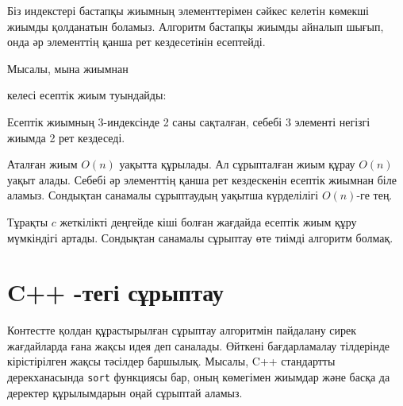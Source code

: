 Біз индекстері бастапқы жиымның элементтерімен сәйкес келетін көмекші жиымды қолданатын боламыз. Алгоритм бастапқы  жиымды айналып шығып, онда әр элементтің қанша рет кездесетінін есептейді.

Мысалы, мына жиымнан
\begin{center}
\end{center}
келесі есептік жиым туындайды:
\begin{center}
\end{center}

Есептік жиымның 3-индексінде
2 саны сақталған, себебі
3 элементі негізгі жиымда 2 рет кездеседі.

Аталған жиым $O(n)$ уақытта құрылады. Ал сұрыпталған
жиым құрау $O(n)$ уақыт алады. Себебі әр элементтің 
қанша рет кездескенін есептік жиымнан біле аламыз.
Сондықтан санамалы сұрыптаудың уақытша күрделілігі $O(n)$-ге тең.

Тұрақты $c$ жеткілікті деңгейде кіші болған
жағдайда есептік жиым құру мүмкіндігі артады.
Сондықтан санамалы сұрыптау өте тиімді алгоритм болмақ.

\section{C++ -тегі сұрыптау}


Контестте қолдан құрастырылған сұрыптау алгоритмін пайдалану сирек жағдайларда ғана жақсы идея деп саналады. Өйткені бағдарламалау тілдерінде
кірістірілген жақсы тәсілдер баршылық.
Мысалы, C++ стандартты дерекханасында \texttt{sort}
функциясы бар, оның көмегімен жиымдар және басқа да деректер
құрылымдарын оңай сұрыптай аламыз.

